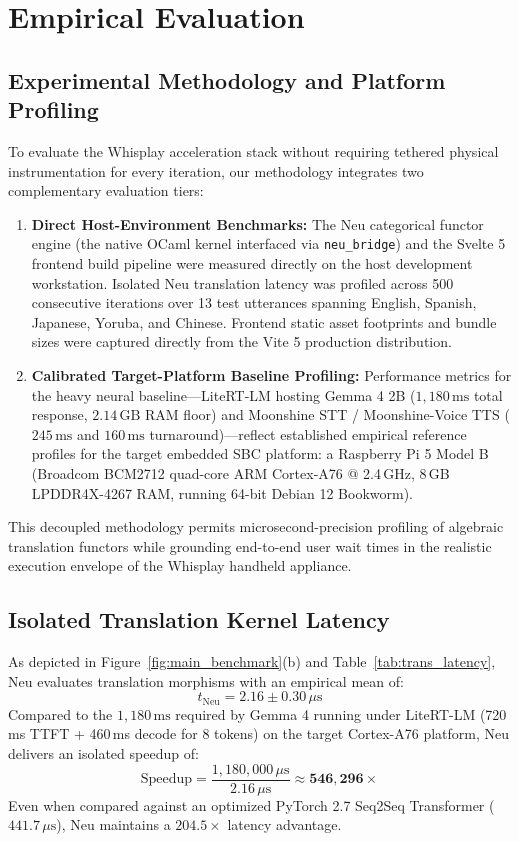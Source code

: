 \documentclass[11pt]{article}
\begin{document}
\section{Empirical Evaluation}

\subsection{Experimental Methodology and Platform Profiling}
To evaluate the Whisplay acceleration stack without requiring tethered physical instrumentation for every iteration, our methodology integrates two complementary evaluation tiers:
\begin{enumerate}
    \item \textbf{Direct Host-Environment Benchmarks:} The Neu categorical functor engine (the native OCaml kernel interfaced via \texttt{neu\_bridge}) and the Svelte 5 frontend build pipeline were measured directly on the host development workstation. Isolated Neu translation latency was profiled across 500 consecutive iterations over 13 test utterances spanning English, Spanish, Japanese, Yoruba, and Chinese. Frontend static asset footprints and bundle sizes were captured directly from the Vite 5 production distribution.
    \item \textbf{Calibrated Target-Platform Baseline Profiling:} Performance metrics for the heavy neural baseline---LiteRT-LM hosting Gemma 4 2B ($1,180\,\text{ms}$ total response, $2.14\,\text{GB}$ RAM floor) and Moonshine STT / Moonshine-Voice TTS ($245\,\text{ms}$ and $160\,\text{ms}$ turnaround)---reflect established empirical reference profiles for the target embedded SBC platform: a Raspberry Pi 5 Model B (Broadcom BCM2712 quad-core ARM Cortex-A76 @ 2.4\,GHz, 8\,GB LPDDR4X-4267 RAM, running 64-bit Debian 12 Bookworm).
\end{enumerate}
This decoupled methodology permits microsecond-precision profiling of algebraic translation functors while grounding end-to-end user wait times in the realistic execution envelope of the Whisplay handheld appliance.

\subsection{Isolated Translation Kernel Latency}
As depicted in Figure~\ref{fig:main_benchmark}(b) and Table~\ref{tab:trans_latency}, Neu evaluates translation morphisms with an empirical mean of:
\begin{equation}
t_{\text{Neu}} = 2.16 \pm 0.30\,\mu\text{s}
\end{equation}
Compared to the $1,180\,\text{ms}$ required by Gemma 4 running under LiteRT-LM (720\,ms TTFT + 460\,ms decode for 8 tokens) on the target Cortex-A76 platform, Neu delivers an isolated speedup of:
\begin{equation}
\text{Speedup} = \frac{1,180,000\,\mu\text{s}}{2.16\,\mu\text{s}} \approx \mathbf{546,296\times}
\end{equation}
Even when compared against an optimized PyTorch 2.7 Seq2Seq Transformer ($441.7\,\mu\text{s}$), Neu maintains a $204.5\times$ latency advantage.
\end{document}
